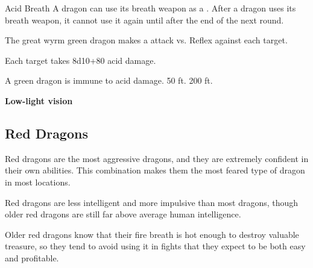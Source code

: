     \begin{freeability}{Acid Breath}
      A dragon can use its breath weapon as a .
      After a dragon uses its breath weapon, it cannot use it again until after the end of the next round.
      \par The great wyrm green dragon makes a  attack
        vs. Reflex against each target.
    
    \hit Each target takes 8d10+80 acid damage.
    \end{freeability}
  
      
       A green dragon is immune to acid damage.
     50 ft.
     200 ft.
    \par\noindent\textbf{Low-light vision}
  
  
    \subsection{Red Dragons}
      
      Red dragons are the most aggressive dragons, and they are extremely confident in their own abilities.
      This combination makes them the most feared type of dragon in most locations.
    
      Red dragons are less intelligent and more impulsive than most dragons, though older red dragons are still far above average human intelligence.
    
      Older red dragons know that their fire breath is hot enough to destroy valuable treasure, so they tend to avoid using it in fights that they expect to be both easy and profitable.
    

